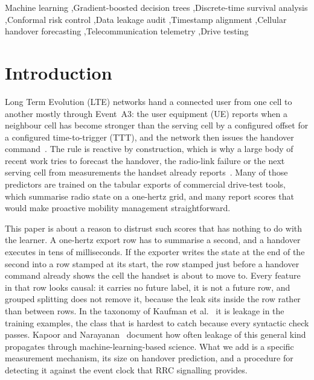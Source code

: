 \documentclass[preprint,review,12pt]{elsarticle}\usepackage{lineno}\linenumbers
\begin{document}
\begin{frontmatter}
\begin{keyword}
Machine learning \sep Gradient-boosted decision trees \sep Discrete-time survival analysis \sep Conformal risk control \sep Data leakage audit \sep Timestamp alignment \sep Cellular handover forecasting \sep Telecommunication telemetry \sep Drive testing
\end{keyword}

\end{frontmatter}

\section{Introduction}
\label{sec:intro}

Long Term Evolution (LTE) networks hand a connected user from one cell to another mostly through Event~A3: the user equipment (UE) reports when a neighbour cell has become stronger than the serving cell by a configured offset for a configured time-to-trigger (TTT), and the network then issues the handover command~\cite{ref1}. The rule is reactive by construction, which is why a large body of recent work tries to forecast the handover, the radio-link failure or the next serving cell from measurements the handset already reports~\cite{ref7,ref8,ref9,ref54}. Many of those predictors are trained on the tabular exports of commercial drive-test tools, which summarise radio state on a one-hertz grid, and many report scores that would make proactive mobility management straightforward.

This paper is about a reason to distrust such scores that has nothing to do with the learner. A one-hertz export row has to summarise a second, and a handover executes in tens of milliseconds. If the exporter writes the state at the end of the second into a row stamped at its start, the row stamped just before a handover command already shows the cell the handset is about to move to. Every feature in that row looks causal: it carries no future label, it is not a future row, and grouped splitting does not remove it, because the leak sits inside the row rather than between rows. In the taxonomy of Kaufman et al.~\cite{ref36} it is leakage in the training examples, the class that is hardest to catch because every syntactic check passes. Kapoor and Narayanan~\cite{ref56} document how often leakage of this general kind propagates through machine-learning-based science. What we add is a specific measurement mechanism, its size on handover prediction, and a procedure for detecting it against the event clock that RRC signalling provides.
\end{document}
